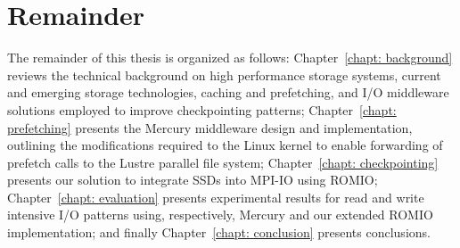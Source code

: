 \section{Remainder}
The remainder of this thesis is organized as follows: Chapter~\ref{chapt: background} reviews the technical background on high performance storage systems, current and emerging storage technologies, caching and
prefetching, and I/O middleware solutions employed to improve checkpointing patterns; Chapter~\ref{chapt: prefetching} presents the Mercury middleware design and implementation, outlining the modifications required to
the Linux kernel to enable forwarding of prefetch calls to the Lustre parallel file system; Chapter~\ref{chapt: checkpointing} presents our solution to integrate SSDs into MPI-IO using ROMIO; Chapter~\ref{chapt: evaluation}
presents experimental results for read and write intensive I/O patterns using, respectively, Mercury and our extended ROMIO implementation; and finally Chapter~\ref{chapt: conclusion} presents conclusions.






